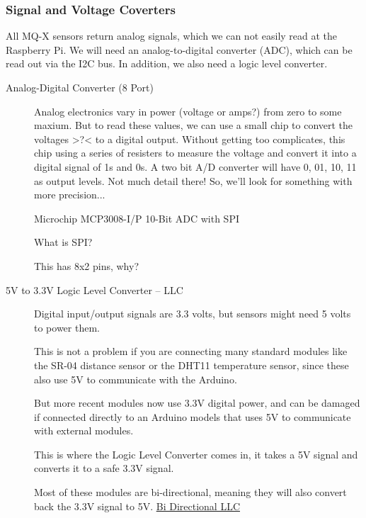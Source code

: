 \documentclass{article}\usepackage[]{graphicx}\usepackage[]{color}
\begin{document}

\subsubsection{Signal and Voltage Coverters}

All MQ-X sensors return analog signals, which we can not easily read at the Raspberry Pi. We will need an analog-to-digital converter (ADC), which can be read out via the I2C bus. In addition, we also need a logic level converter.

\begin{description}
\item[Analog-Digital Converter (8 Port)] Analog electronics vary in power (voltage or amps?) from zero to some maxium. But to read these values, we can use a small chip to convert the voltages >?< to a digital output. Without getting too complicates, this chip using a series of resisters to measure the voltage and convert it into a digital signal of 1s and 0s. A two bit A/D converter will have 0, 01, 10, 11 as output levels. Not much detail there!  So, we'll look for something with more precision...

Microchip MCP3008-I/P 10-Bit ADC with SPI  

What is SPI?

This has 8x2 pins, why?

\item[5V to 3.3V Logic Level Converter -- LLC] 
Digital input/output signals are 3.3 volts, but sensors might need 5 volts to power them.

This is not a problem if you are connecting many standard modules like the SR-04 distance sensor or the DHT11 temperature sensor, since these also use 5V to communicate with the Arduino.

But more recent modules now use 3.3V digital power, and can be damaged if connected directly to an Arduino models that uses 5V to communicate with external modules.

This is where the Logic Level Converter comes in, it takes a 5V signal and converts it to a safe 3.3V signal.

Most of these modules are bi-directional, meaning they will also convert back the 3.3V signal to 5V. \href{https://learn.sparkfun.com/tutorials/bi-directional-logic-level-converter-hookup-guide}{Bi Directional LLC}


\end{description}
\end{document}
